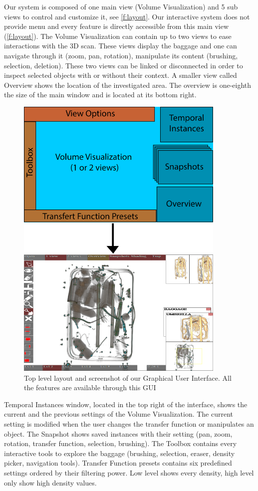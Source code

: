Our system is composed of one main view (Volume Visualization) and 5 sub views to control and customize it, see  \autoref{f:layout}. Our interactive system does not provide menu and every feature is directly accessible from this main view (\autoref{f:layout}).
The Volume Visualization can contain up to two views to ease interactions with the 3D scan. These views display the baggage and one can navigate through it (zoom, pan, rotation), manipulate its content (brushing, selection, deletion). These two views can be linked or disconnected in order to inspect selected objects with or without their context.
A smaller view called Overview shows the location of the investigated area. The overview is one-eighth the size of the main window and is located at its bottom right.
\begin{figure}
\centering
	\includegraphics[height=14cm]{Figures/layout}
	\caption{Top level layout and screenshot of our Graphical User Interface. All the features are available through this GUI}
	\label{f:layout}
\end{figure}

Temporal Instances window, located in the top right of the interface, shows the current and the previous settings of the Volume Visualization. The current setting is modified when the user changes the transfer function or manipulates an object.
The Snapshot shows saved instances with their setting (pan, zoom, rotation, transfer function, selection, brushing).
The Toolbox contains every interactive tools to explore the baggage (brushing, selection, eraser, density picker, navigation tools).
Transfer Function presets contains six predefined settings ordered by their filtering power. Low level shows every density, high level only show high density values. 

